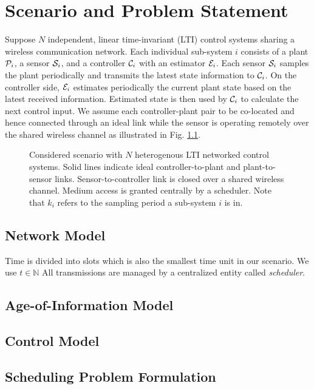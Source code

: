 \chapter{Scenario and Problem Statement}

Suppose $N$ independent, linear time-invariant (LTI) control systems sharing a
wireless communication network. Each individual sub-system $i$ consists of a
plant $\mathcal{P}_i$, a sensor $\mathcal{S}_i$, and a controller $\mathcal{C}_i$ with an
estimator $\mathcal{E}_i$. Each sensor $\mathcal{S}_i$ samples the plant periodically and
transmits the latest state information to $\mathcal{C}_i$. On the controller side,
$\mathcal{E}_i$ estimates periodically the current plant state based on the latest
received information. Estimated state is then used by $\mathcal{C}_i$ to calculate
the next control input. We assume each controller-plant pair to be co-located
and hence connected through an ideal link while the sensor is operating remotely
over the shared wireless channel as illustrated in Fig. \ref{fig:scenario}.

\begin{figure}[h]
  \centering
  
  \caption[Scheme of $N$ sub-systems sharing a wireless communication medium]{Considered scenario with $N$ heterogenous LTI networked control systems. Solid lines indicate ideal controller-to-plant and plant-to-sensor links. Sensor-to-controller link is closed over a shared wireless channel. Medium access is granted centrally by a scheduler. Note that $k_i$ refers to the sampling period a sub-system $i$ is in.}
  \label{fig:scenario}
\end{figure}

\section{Network Model}
Time is divided into slots which is also the smallest time unit in our scenario.
We use $t \in \mathbb{N}$ All transmissions are managed by a centralized entity
called \textit{scheduler}.

\section{Age-of-Information Model}

\section{Control Model}

\section{Scheduling Problem Formulation} \label{sec:problem}
